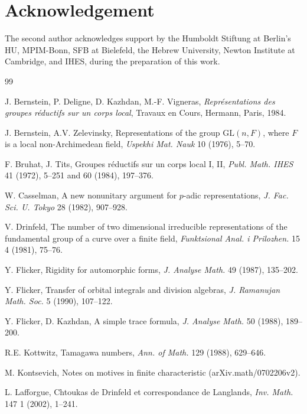 \documentclass[11pt,a4paper]{article}
\theoremstyle{plain}
\theoremstyle{definition}
\newcommand{\GL}{\mathrm{GL}}
\begin{document}
\section*{Acknowledgement}

The second author acknowledges support by the Humboldt Stiftung at Berlin's HU, MPIM-Bonn, SFB at Bielefeld, the Hebrew University, Newton Institute at Cambridge, and IHES, during the preparation of this work.

\begin{thebibliography}{99}

 J. Bernstein, P. Deligne, D. Kazhdan, M.-F. Vigneras, \textit{Repr\'esentations des groupes r\'eductifs sur un corps local}, Travaux en Cours, Hermann, Paris, 1984.

 J. Bernstein, A.V. Zelevinsky, Representations of the group $\GL(n,F)$, where $F$ is a local non-Archimedean field, \textit{Uspekhi Mat. Nauk} 10 (1976), 5--70.

 F. Bruhat, J. Tits, Groupes r\'eductifs sur un corps local I, II, \textit{Publ. Math. IHES} 41 (1972), 5--251 and 60 (1984), 197--376.

 W. Casselman, A new nonunitary argument for $p$-adic representations, \textit{J. Fac. Sci. U. Tokyo} 28 (1982), 907--928.

 V. Drinfeld, The number of two dimensional irreducible representations of the fundamental group of a curve over a finite field, \textit{Funktsional Anal. i Prilozhen.} 15 4 (1981), 75--76.

 Y. Flicker, Rigidity for automorphic forms, \textit{J. Analyse Math.} 49 (1987), 135--202.

 Y. Flicker, Transfer of orbital integrals and division algebras, \textit{J. Ramanujan Math. Soc.} 5 (1990), 107--122.

 Y. Flicker, D. Kazhdan, A simple trace formula, \textit{J. Analyse Math.} 50 (1988), 189--200.

 R.E. Kottwitz, Tamagawa numbers, \textit{Ann. of Math.} 129 (1988), 629--646.

 M. Kontsevich, Notes on motives in finite characteristic (arXiv.math/0702206v2).

 L. Lafforgue, Chtoukas de Drinfeld et correspondance de Langlands, \textit{Inv. Math.} 147 1 (2002), 1--241.


\end{thebibliography}
\end{document}
